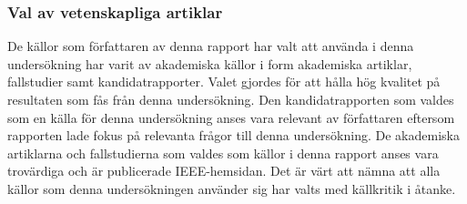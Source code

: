 \subsubsection{Val av vetenskapliga artiklar}
De källor som författaren av denna rapport har valt att använda i denna undersökning har varit av akademiska källor i form akademiska artiklar, fallstudier samt kandidatrapporter. Valet gjordes för att hålla hög kvalitet på resultaten som fås från denna undersökning. Den kandidatrapporten som valdes som en källa för denna undersökning anses vara relevant av författaren eftersom rapporten lade fokus på relevanta frågor till denna undersökning. De akademiska artiklarna och fallstudierna som valdes som källor i denna rapport anses vara trovärdiga och är publicerade IEEE-hemsidan. Det är värt att nämna att alla källor som denna undersökningen använder sig har valts med källkritik i åtanke.